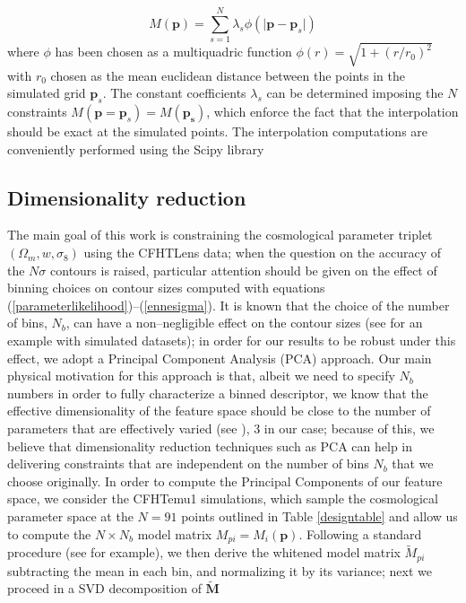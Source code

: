 \documentclass[reprint,aps,prd,superscriptaddress,showkeys]{revtex4-1}
\begin{document}
\begin{equation}
M(\mathbf{p}) = \sum_{s=1}^N \lambda_s\phi(\vert\mathbf{p}-\mathbf{p}_s\vert)
\end{equation}
%
where $\phi$ has been chosen as a multiquadric function $\phi(r)=\sqrt{1+(r/r_0)^2}$ with $r_0$ chosen as the mean euclidean distance between the points in the simulated grid $\mathbf{p}_s$. The constant coefficients $\lambda_s$ can be determined imposing the $N$ constraints $M(\mathbf{p}=\mathbf{p}_s)=M(\mathbf{p_s})$, which enforce the fact that the interpolation should be exact at the simulated points. The interpolation computations are conveniently performed using the Scipy library \citep{scipy} 

\subsection{Dimensionality reduction}
\label{pcasection}
%
The main goal of this work is constraining the cosmological parameter triplet $(\Omega_m,w,\sigma_8)$ using the CFHTLens data; when the question on the accuracy of the $N\sigma$ contours is raised, particular attention should be given on the effect of binning choices on contour sizes computed with equations (\ref{parameterlikelihood})--(\ref{ennesigma}). It is known that the choice of the number of bins, $N_b$, can have a non--negligible effect on the contour sizes (see \citep{Petri2013} for an example with simulated datasets); in order for our results to be robust under this effect, we adopt a Principal Component Analysis (PCA) approach. Our main physical motivation for this approach is that, albeit we need to specify $N_b$ numbers in order to fully characterize a binned descriptor, we know that the effective dimensionality of the feature space should be close to the number of parameters that are effectively varied (see \citep{coyote2}), 3 in our case; because of this, we believe that dimensionality reduction techniques such as PCA can help in delivering constraints that are independent on the number of bins $N_b$ that we choose originally. In order to compute the Principal Components of our feature space, we consider the CFHTemu1 simulations, which sample the cosmological parameter space at the $N=91$ points outlined in Table \ref{designtable} and allow us to compute the $N\times N_b$ model matrix $M_{pi}=M_i(\mathbf{p})$. Following a standard procedure (see \citep{astroMLText} for example), we then derive the whitened model matrix $\tilde{M}_{pi}$ subtracting the mean in each bin, and normalizing it by its variance; next we proceed in a SVD decomposition of $\mathbf{\tilde{M}}$
\end{document}
